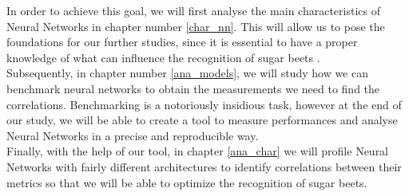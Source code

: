 In order to achieve this goal, we will first analyse the main characteristics of Neural Networks in chapter number \ref{char_nn}. This will allow us to pose the foundations for our further studies, since it is essential to have a proper knowledge of what can influence the recognition of sugar beets .\\
Subsequently, in chapter number \ref{ana_models}, we will study how we can benchmark neural networks to obtain the measurements we need to find the correlations. Benchmarking is a notoriously insidious task, however at the end of our study, we will be able to create a tool to measure performances and analyse Neural Networks in a precise and reproducible way.\\
Finally, with the help of our tool, in chapter \ref{ana_char} we will profile Neural Networks with fairly different architectures to identify correlations between their metrics so that we will be able to optimize the recognition of sugar beets. 
